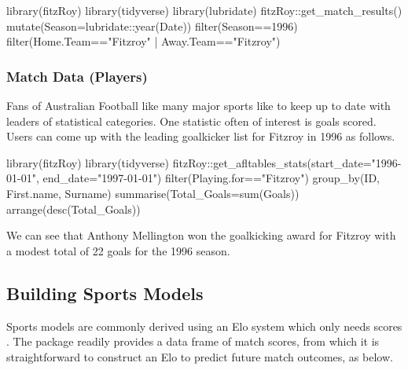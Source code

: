\begin{example}
library(fitzRoy)
library(tidyverse)
library(lubridate)
fitzRoy::get_match_results()%
mutate(Season=lubridate::year(Date))%
filter(Season==1996)%
filter(Home.Team=="Fitzroy" | Away.Team=="Fitzroy")
\end{example}


\subsubsection{Match Data (Players)}

Fans of Australian Football like many major sports like to keep up to date with leaders of statistical categories. One statistic often of interest is goals scored. Users can come up with the leading goalkicker list for Fitzroy in 1996 as follows.

\begin{example}
library(fitzRoy)
library(tidyverse)
fitzRoy::get_afltables_stats(start_date="1996-01-01",
end_date="1997-01-01")%
filter(Playing.for=="Fitzroy")%
group_by(ID, First.name, Surname)%
summarise(Total_Goals=sum(Goals))%
arrange(desc(Total_Goals))
\end{example}

 We can see that  Anthony  Mellington won the goalkicking award for Fitzroy with a modest total of 22 goals for the 1996 season. 


\subsection{Building Sports Models}

Sports models are commonly derived using an Elo system which only needs scores \citep{ryall2010optimized}.
The  package readily provides a data frame of match scores, from which it is straightforward to construct an Elo to predict future match outcomes, as below.

